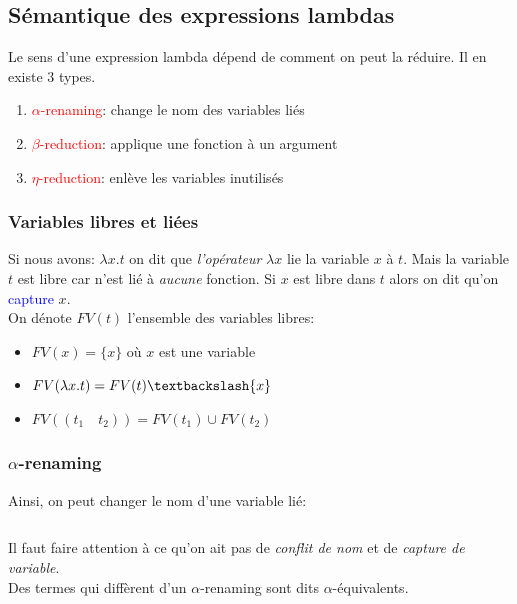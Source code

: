 \documentclass{report}
\begin{document}
\subsection{Sémantique des expressions lambdas}
Le sens d'une expression lambda dépend de comment on peut la réduire. Il en existe 3 types.
\begin{enumerate}
\item \textcolor{red}{$\alpha$-renaming}: change le nom des variables liés
\item \textcolor{red}{$\beta$-reduction}: applique une fonction à un argument
\item \textcolor{red}{$\eta$-reduction}: enlève les variables inutilisés
\end{enumerate}

\subsubsection{Variables libres et liées}	
Si nous avons: $\lambda x.t$ on dit que \textit{l'opérateur} $\lambda x$ lie la variable $x$ à $t$. Mais la variable $t$ est libre car n'est lié à \textit{aucune} fonction. Si $x$ est libre dans $t$ alors on dit qu'on \textcolor{blue}{capture} $x$.\\
On dénote $FV(t)$ l'ensemble des variables libres:
\begin{itemize}
\item $FV(x) = \{x\}$ où $x$ est une variable
\item $FV(\lambda x.t) = FV(t) \textbackslash \{x\}$
\item $FV((t_1 \quad t_2))=FV(t_1) \cup FV(t_2)$
\end{itemize}

\subsubsection{$\alpha$-renaming}
Ainsi, on peut changer le nom d'une variable lié:
\begin{lstlisting}[escapechar=\%]
%$\lambda$% x. x %$\rightarrow_{\alpha}\lambda$%y. y
\end{lstlisting}
Il faut faire attention à ce qu'on ait pas de \textit{conflit de nom} et de \textit{capture de variable}.\\
Des termes qui diffèrent d'un $\alpha$-renaming sont dits $\alpha$-équivalents.
\end{document}
